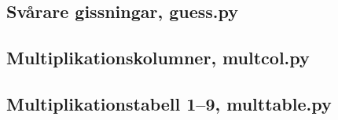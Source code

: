 \begin{frame}[fragile]
  
\end{frame}

\begin{frame}[fragile]
  
\end{frame}


\subsection{Svårare gissningar, guess.py}

\begin{frame}[fragile]
  
\end{frame}

\begin{frame}[fragile]
  
\end{frame}

\begin{frame}[fragile]
  
  
\end{frame}

\subsection{Multiplikationskolumner, multcol.py}

\begin{frame}
  
\end{frame}

\begin{frame}
  
\end{frame}

\subsection{Multiplikationstabell 1--9, multtable.py}

\begin{frame}
  
\end{frame}

